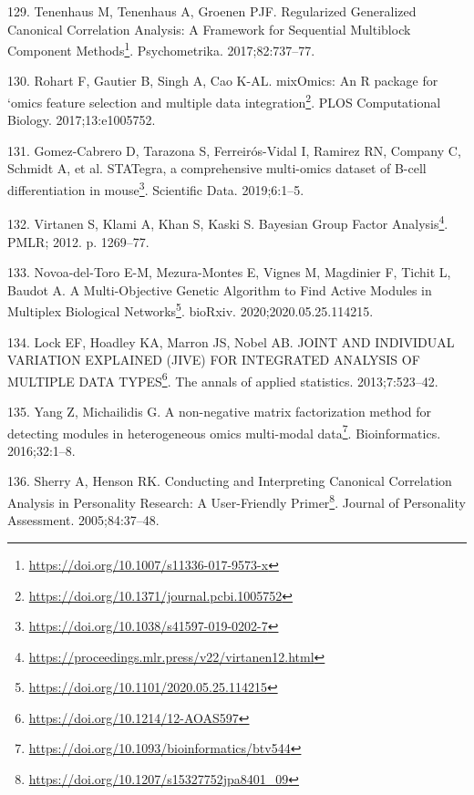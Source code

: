 \documentclass[
  a4paper,
]{book}
\DeclareRobustCommand{\href}[2]{#2\footnote{\url{#1}}}
\newlength{\cslhangindent}
\newlength{\cslentryspacingunit} %
\newenvironment{CSLReferences}[2] %
 {%
  \setlength{\parindent}{0pt}
  \ifodd #1
  \let\oldpar\par
  \def\par{\hangindent=\cslhangindent\oldpar}
  \fi
  \setlength{\parskip}{#2\cslentryspacingunit}
 }%
 {}
\begin{document}
\begin{CSLReferences}{0}{0}
\leavevmode{}%
129. Tenenhaus M, Tenenhaus A, Groenen PJF. \href{https://doi.org/10.1007/s11336-017-9573-x}{Regularized Generalized Canonical Correlation Analysis: A Framework for Sequential Multiblock Component Methods}. Psychometrika. 2017;82:737--77.

\leavevmode{}%
130. Rohart F, Gautier B, Singh A, Cao K-AL. \href{https://doi.org/10.1371/journal.pcbi.1005752}{mixOmics: An R package for {`}omics feature selection and multiple data integration}. PLOS Computational Biology. 2017;13:e1005752.

\leavevmode{}%
131. Gomez-Cabrero D, Tarazona S, Ferreirós-Vidal I, Ramirez RN, Company C, Schmidt A, et al. \href{https://doi.org/10.1038/s41597-019-0202-7}{STATegra, a comprehensive multi-omics dataset of B-cell differentiation in mouse}. Scientific Data. 2019;6:1--5.

\leavevmode{}%
132. Virtanen S, Klami A, Khan S, Kaski S. \href{https://proceedings.mlr.press/v22/virtanen12.html}{Bayesian Group Factor Analysis}. PMLR; 2012. p. 1269--77.

\leavevmode{}%
133. Novoa-del-Toro E-M, Mezura-Montes E, Vignes M, Magdinier F, Tichit L, Baudot A. \href{https://doi.org/10.1101/2020.05.25.114215}{A Multi-Objective Genetic Algorithm to Find Active Modules in Multiplex Biological Networks}. bioRxiv. 2020;2020.05.25.114215.

\leavevmode{}%
134. Lock EF, Hoadley KA, Marron JS, Nobel AB. \href{https://doi.org/10.1214/12-AOAS597}{JOINT AND INDIVIDUAL VARIATION EXPLAINED (JIVE) FOR INTEGRATED ANALYSIS OF MULTIPLE DATA TYPES}. The annals of applied statistics. 2013;7:523--42.

\leavevmode{}%
135. Yang Z, Michailidis G. \href{https://doi.org/10.1093/bioinformatics/btv544}{A non-negative matrix factorization method for detecting modules in heterogeneous omics multi-modal data}. Bioinformatics. 2016;32:1--8.

\leavevmode{}%
136. Sherry A, Henson RK. \href{https://doi.org/10.1207/s15327752jpa8401_09}{Conducting and Interpreting Canonical Correlation Analysis in Personality Research: A User-Friendly Primer}. Journal of Personality Assessment. 2005;84:37--48.


\end{CSLReferences}
\end{document}
